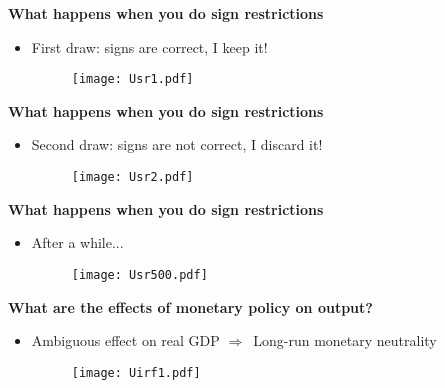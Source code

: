 \documentclass[10pt,handout]{beamer}
\begin{document}
\vspace{.1cm}

\begin{frame}
{\textbf{What happens when you do sign restrictions }}

\begin{itemize}
\item First draw: signs are correct, I keep it! 
\begin{figure}[h]
\centering\texttt{[image: Usr1.pdf]}
\end{figure}
\end{itemize}
\end{frame}

\vspace{.1cm}

\begin{frame}
{\textbf{What happens when you do sign restrictions }}

\begin{itemize}
\item Second draw: signs are not correct, I discard it! 
\begin{figure}[h]
\centering\texttt{[image: Usr2.pdf]}
\end{figure}
\end{itemize}
\end{frame}

\vspace{.1cm}

\begin{frame}
{\textbf{What happens when you do sign restrictions }}

\begin{itemize}
\item After a while... 
\begin{figure}[h]
\centering\texttt{[image: Usr500.pdf]}
\end{figure}
\end{itemize}
\end{frame}

\vspace{.1cm}

\begin{frame}
{\textbf{What are the effects of monetary policy on output?}}

\begin{itemize}
\item Ambiguous effect on real GDP $\Longrightarrow $\ Long-run monetary
neutrality 
\begin{figure}[h]
\centering\texttt{[image: Uirf1.pdf]}
\end{figure}
\end{itemize}
\end{frame}
\end{document}
